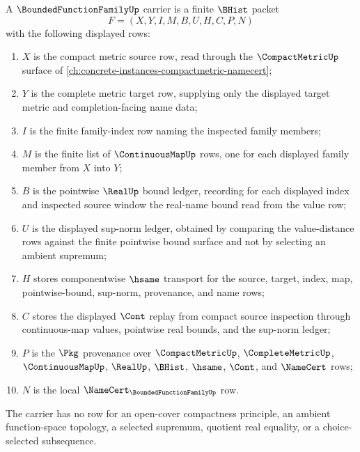 \begin{definition}
\label{def:bounded-function-family-carrier}
A $\BoundedFunctionFamilyUp$ carrier is a finite $\BHist$ packet
$$
F=(X,Y,I,M,B,U,H,C,P,N)
$$
with the following displayed rows:
\begin{enumerate}
\item $X$ is the compact metric source row, read through the $\CompactMetricUp$ surface of \autoref{ch:concrete-instances-compactmetric-namecert};
\item $Y$ is the complete metric target row, supplying only the displayed target metric and completion-facing name data;
\item $I$ is the finite family-index row naming the inspected family members;
\item $M$ is the finite list of $\ContinuousMapUp$ rows, one for each displayed family member from $X$ into $Y$;
\item $B$ is the pointwise $\RealUp$ bound ledger, recording for each displayed index and inspected source window the real-name bound read from the value row;
\item $U$ is the displayed sup-norm ledger, obtained by comparing the value-distance rows against the finite pointwise bound surface and not by selecting an ambient supremum;
\item $H$ stores componentwise $\hsame$ transport for the source, target, index, map, pointwise-bound, sup-norm, provenance, and name rows;
\item $C$ stores the displayed $\Cont$ replay from compact source inspection through continuous-map values, pointwise real bounds, and the sup-norm ledger;
\item $P$ is the $\Pkg$ provenance over $\CompactMetricUp$, $\CompleteMetricUp$, $\ContinuousMapUp$, $\RealUp$, $\BHist$, $\hsame$, $\Cont$, and $\NameCert$ rows;
\item $N$ is the local $\NameCert_{\BoundedFunctionFamilyUp}$ row.
\end{enumerate}
The carrier has no row for an open-cover compactness principle, an ambient function-space topology, a selected supremum, quotient real equality, or a choice-selected subsequence.
\end{definition}

